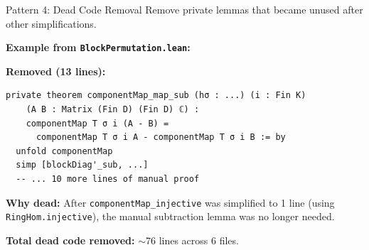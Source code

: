 \documentclass[aspectratio=169,10pt]{beamer}
\begin{document}
\begin{frame}[fragile]{Pattern 4: Dead Code Removal}
    \vspace{-0.3em}
    Remove private lemmas that became unused after other simplifications.

    \vspace{0.5em}
    \textbf{Example from \texttt{BlockPermutation.lean}:}

    \vspace{0.3em}
    \textbf{\textcolor{softred}{Removed (13 lines):}}
    \begin{lstlisting}
private theorem componentMap_map_sub (hσ : ...) (i : Fin K)
    (A B : Matrix (Fin D) (Fin D) ℂ) :
    componentMap T σ i (A - B) =
      componentMap T σ i A - componentMap T σ i B := by
  unfold componentMap
  simp [blockDiag'_sub, ...]
  -- ... 10 more lines of manual proof
    \end{lstlisting}

    \vspace{0.3em}
    {\small
    \textbf{Why dead:} After \texttt{componentMap\_injective} was simplified to 1 line
    (using \texttt{RingHom.injective}), the manual subtraction lemma
    was no longer needed.

    \vspace{0.2em}
    \textbf{Total dead code removed:} ${\sim}$76 lines across 6 files.
    }
\end{frame}
\end{document}
